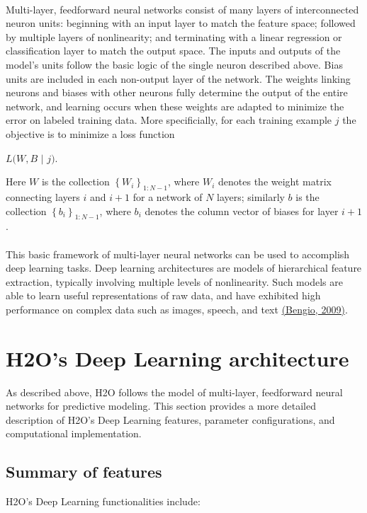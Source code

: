 \documentclass[12pt]{article}
\begin{document}
\\
\noindent
Multi-layer, feedforward neural networks consist of many layers of interconnected neuron units: beginning with an input layer to match the feature space; followed by multiple layers of nonlinearity; and terminating with a linear regression or classification layer to match the output space. The inputs and outputs of the model's units follow the basic logic of the single neuron described above. Bias units are included in each non-output layer of the network. The weights linking neurons and biases with other neurons fully determine the output of the entire network, and learning occurs when these weights are adapted to minimize the error on labeled training data. More specificially, for each training example $j$ the objective is to minimize a loss function 
\begin{center}
$L(W,B$ $|$ $j)$.
\end{center}
Here $W$ is the collection $\left\{W_i\right\}_{1:N-1}$, where $W_i$ denotes the weight matrix connecting layers $i$ and $i+1$ for a network of $N$ layers; similarly $b$ is the collection $\left\{b_i\right\}_{1:N-1}$, where $b_i$ denotes the column vector of biases for layer $i+1$. 
\\
\\
This basic framework of multi-layer neural networks can be used to accomplish deep learning tasks. Deep learning architectures are models of hierarchical feature extraction, typically involving multiple levels of nonlinearity. Such models are able to learn useful representations of raw data, and have exhibited high performance on complex data such as images, speech, and text \href{http://www.iro.umontreal.ca/~lisa/pointeurs/TR1312.pdf}{(Bengio, 2009)}. 


\section{H2O's Deep Learning architecture}

As described above, H2O follows the model of multi-layer, feedforward neural networks for predictive modeling. This section provides a more detailed description of H2O's Deep Learning features, parameter configurations, and computational implementation.

\subsection{Summary of features}
H2O's Deep Learning functionalities include:
\end{document}
